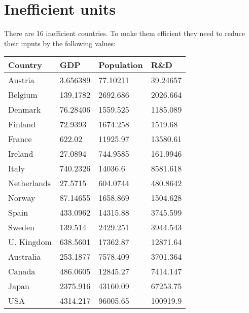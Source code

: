 \documentclass[11pt]{article}
\begin{document}
\section{Inefficient units}
There are 16 inefficient countries. To make them efficient they need to reduce their inputs by the following values:
\begin{center}
	\begin{tabular}{| m{3cm} | m{3cm} | m{3cm} | m{3cm} |}
	\hline
	\textbf{Country} & \textbf{GDP} & \textbf{Population} & \textbf{R\&D} \\
	\hline \hline
	Austria & 3.656389 & 77.10211 & 39.24657 \\
	\hline
	Belgium & 139.1782 & 2692.686 & 2026.664 \\
	\hline
	Denmark & 76.28406 & 1559.525 & 1185.089 \\
	\hline
	Finland & 72.9393 & 1674.258 & 1519.68 \\
	\hline
	France & 622.02 & 11925.97 & 13580.61 \\
	\hline
	Ireland & 27.0894 & 744.9585 & 161.9946 \\
	\hline
	Italy & 740.2326 & 14036.6 & 8581.618 \\
	\hline
	Netherlands & 27.5715 & 604.0744 & 480.8642 \\
	\hline
	Norway & 87.14655 & 1658.869 & 1504.628 \\
	\hline
	Spain & 433.0962 & 14315.88 & 3745.599 \\
	\hline
	Sweden & 139.514 & 2429.251 & 3944.543 \\
	\hline
	U. Kingdom & 638.5601 & 17362.87 & 12871.64 \\
	\hline
	Australia & 253.1877 & 7578.409 & 3701.364 \\
	\hline
	Canada & 486.0605 & 12845.27 & 7414.147 \\
	\hline
	Japan & 2375.916 & 43160.09 & 67253.75 \\
	\hline
	USA & 4314.217 & 96005.65 & 100919.9 \\
	\hline
	\end{tabular}
\end{center}
\end{document}

